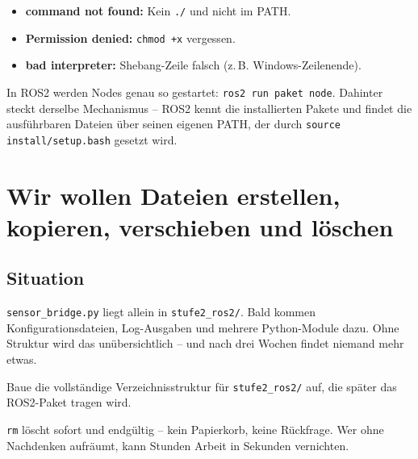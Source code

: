 \begin{fehlerBox}
\begin{itemize}
  \item \textbf{command not found:} Kein \texttt{./} und nicht im PATH.
  \item \textbf{Permission denied:} \texttt{chmod +x} vergessen.
  \item \textbf{bad interpreter:} Shebang-Zeile falsch (z.\,B. Windows-Zeilenende).
\end{itemize}
\end{fehlerBox}

\begin{robotikBox}
In ROS2 werden Nodes genau so gestartet: \texttt{ros2 run paket node}.
Dahinter steckt derselbe Mechanismus -- ROS2 kennt die installierten
Pakete und findet die ausführbaren Dateien über seinen eigenen PATH,
der durch \texttt{source install/setup.bash} gesetzt wird.
\end{robotikBox}

\chapter{Wir wollen Dateien erstellen, kopieren, verschieben und löschen}

\kapitelstruktur

\section{Situation}

\texttt{sensor\_bridge.py} liegt allein in \texttt{stufe2\_ros2/}.
Bald kommen Konfigurationsdateien, Log-Ausgaben und mehrere
Python-Module dazu. Ohne Struktur wird das unübersichtlich --
und nach drei Wochen findet niemand mehr etwas.

\begin{aufgabeBox}
Baue die vollständige Verzeichnisstruktur für
\texttt{stufe2\_ros2/} auf, die später das ROS2-Paket tragen wird.
\end{aufgabeBox}

\begin{problemBox}
\texttt{rm} löscht sofort und endgültig -- kein Papierkorb, keine
Rückfrage. Wer ohne Nachdenken aufräumt, kann Stunden Arbeit
in Sekunden vernichten.
\end{problemBox}

